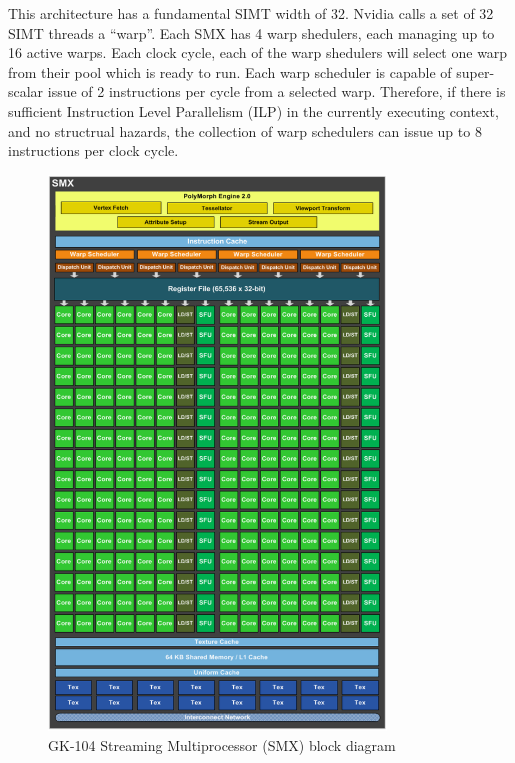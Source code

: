 \documentclass[11pt, oneside, a4paper]{article}
\begin{document}
This architecture has a fundamental SIMT width of 32. Nvidia calls a set of 32 SIMT threads a ``warp''.
Each SMX has 4 warp shedulers, each managing up to 16 active warps. Each clock cycle, each of the warp shedulers will select one warp from their pool which is ready to run.
Each warp scheduler is capable of super-scalar issue of 2 instructions per cycle from a selected warp.
Therefore, if there is sufficient Instruction Level Parallelism (ILP) in the currently executing context, and no structrual hazards, the collection of warp schedulers can issue up to 8 instructions per clock cycle.

\begin{figure}[tb]
	\begin{center}
		\includegraphics[width=0.8\textwidth]{SMX}
	\end{center}
	\caption{GK-104 Streaming Multiprocessor (SMX) block diagram}
	\label{fig:SMX}
\end{figure}
\end{document}
